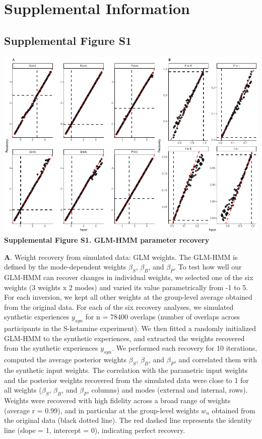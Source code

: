 \documentclass[
]{article}
\begin{document}
\section{Supplemental Information}\label{supplemental-information}

\subsection{Supplemental Figure S1}\label{supplemental-figure-s1}

\includegraphics{modes_ketamine_scz_files/figure-latex/Supplemental_Figure_S1-1.pdf}
\textbf{Supplemental Figure S1. GLM-HMM parameter recovery}

\textbf{A}. Weight recovery from simulated data: GLM weights. The
GLM-HMM is defined by the mode-dependent weights \(\beta_S\),
\(\beta_B\), and \(\beta_P\). To test how well our GLM-HMM can recover
changes in individual weights, we selected one of the six weights (3
weights x 2 modes) and varied its value parametrically from -1 to 5. For
each inversion, we kept all other weights at the group-level average
obtained from the original data. For each of the six recovery analyses,
we simulated synthetic experiences \(y_{syn}\) for n = 78400 overlaps
(number of overlaps across participants in the S-ketamine experiment).
We then fitted a randomly initialized GLM-HMM to the synthetic
experiences, and extracted the weights recovered from the synthetic
experiences \(y_{syn}\). We performed each recovery for 10 iterations,
computed the average posterior weights \(\beta_S\), \(\beta_B\), and
\(\beta_P\), and correlated them with the synthetic input weights. The
correlation with the parametric input weights and the posterior weights
recovered from the simulated data were close to 1 for all weights
(\(\beta_S\), \(\beta_B\), and \(\beta_P\), columns) and modes (external
and internal, rows). Weights were recovered with high fidelity across a
broad range of weights (average r = 0.99), and in particular at the
group-level weights \(w_n\) obtained from the original data (black
dotted line). The red dashed line represents the identity line (slope =
1, intercept = 0), indicating perfect recovery.
\end{document}
